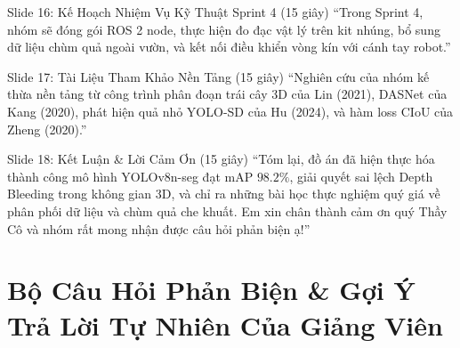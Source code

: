 \documentclass[11pt,a4paper]{article}
\begin{document}
\vspace{4pt}

\begin{scriptbox}{Slide 16: Kế Hoạch Nhiệm Vụ Kỹ Thuật Sprint 4 (15 giây)}
``Trong Sprint 4, nhóm sẽ đóng gói ROS 2 node, thực hiện đo đạc vật lý trên kit nhúng, bổ sung dữ liệu chùm quả ngoài vườn, và kết nối điều khiển vòng kín với cánh tay robot.''
\end{scriptbox}

\vspace{4pt}

\begin{scriptbox}{Slide 17: Tài Liệu Tham Khảo Nền Tảng (15 giây)}
``Nghiên cứu của nhóm kế thừa nền tảng từ công trình phân đoạn trái cây 3D của Lin (2021), DASNet của Kang (2020), phát hiện quả nhỏ YOLO-SD của Hu (2024), và hàm loss CIoU của Zheng (2020).''
\end{scriptbox}

\vspace{4pt}

\begin{scriptbox}{Slide 18: Kết Luận \& Lời Cảm Ơn (15 giây)}
``Tóm lại, đồ án đã hiện thực hóa thành công mô hình YOLOv8n-seg đạt mAP $98.2\%$, giải quyết sai lệch Depth Bleeding trong không gian 3D, và chỉ ra những bài học thực nghiệm quý giá về phân phối dữ liệu và chùm quả che khuất. Em xin chân thành cảm ơn quý Thầy Cô và nhóm rất mong nhận được câu hỏi phản biện ạ!''
\end{scriptbox}

\newpage

\section{Bộ Câu Hỏi Phản Biện \& Gợi Ý Trả Lời Tự Nhiên Của Giảng Viên}
\label{sec:defense_qa}
\end{document}
